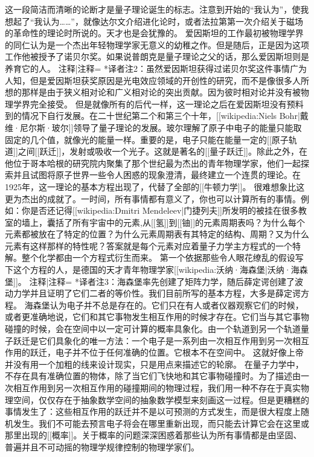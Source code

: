     这一段简洁而清晰的论断才是量子理论诞生的标志。注意到开始的“我认为”，使我想起了“我认为……”，就像达尔文介绍进化论时，或者法拉第第一次介绍关于磁场的革命性的理论时所说的。天才也是会犹豫的。
    爱因斯坦的工作最初被物理学界的同仁认为是一个杰出年轻物理学家无意义的幼稚之作。但是随后，正是因为这项工作他被授予了诺贝尔奖。如果说普朗克是量子理论之父的话，那么爱因斯坦则是养育它的人。
{{注释|注释=
*译者注2：虽然爱因斯坦获得过诺贝尔奖这件事情广为人知，但是爱因斯坦获奖原因是光电效应领域的开创性的研究，而不是像很多人所想的那样是由于狭义相对论和广义相对论的突出贡献。因为彼时相对论并没有被物理学界完全接受。
}}
    但是就像所有的后代一样，这一理论之后在爱因斯坦没有预料到的情况下自行发展。在二十世纪第二个和第三个十年，[[wikipedia:Niels Bohr|戴维·尼尔斯·玻尔]]领导了量子理论的发展。玻尔理解了原子中电子的能量只能取固定的几个值，就像光的能量一样。重要的是，电子只能在能量一定的[[原子轨道]]之间[[跃迁]]，发射或吸收一个光子。这就是著名的[[量子跃迁]]。除此之外，在他位于哥本哈根的研究院内聚集了那个世纪最为杰出的青年物理学家，他们一起探索并且试图将原子世界一些令人困惑的现象澄清，最终建立一个连贯的理论。在1925年，这一理论的基本方程出现了，代替了全部的[[牛顿力学]]。
    很难想象比这更为杰出的成就了。一时间，所有事情都有意义了，你也可以计算所有的事情。例如：你是否还记得[[wikipedia:Dmitri Mendeleev|门捷列夫]]所发明的被挂在很多教室的墙上，囊括了所有宇宙中的元素,从[[氢]]到[[铀]]的元素周期表吗？为什么每个元素都被放在了特定的位置？为什么元素周期表有其特定的结构、周期？又为什么元素有这样那样的特性呢？答案就是每个元素对应着量子力学主方程式的一个特解。整个化学都由一个方程式衍生而来。
    第一个依据那些令人眼花缭乱的假设写下这个方程的人，是德国的天才青年物理学家[[wikipedia:沃纳·海森堡|沃纳·海森堡]]。
{{注释|注释=
*译者注3：海森堡率先创建了矩阵力学，随后薛定谔创建了波动力学并且证明了它们二者的等价性。我们目前所写的基本方程，大多是薛定谔方程。
}}
    海森堡认为电子并不总是存在的。它们只在有人或者仪器观察它们的时候，或者更准确地说，它们和其它事物发生相互作用的时候才存在。它们当与其它事物碰撞的时候，会在空间中以一定可计算的概率具象化。由一个轨道到另一个轨道量子跃迁是它们具象化的唯一方法：一个电子是一系列由一次相互作用到另一次相互作用的跃迁，电子并不位于任何准确的位置。它根本不在空间中。
    这就好像上帝并没有用一个加粗的线来设计现实，只是用点来描述它的轮廓。
    在量子力学中，不存在具有准确位置的物体，除了当它们飞快地和其它事物碰撞时。为了描述由一次相互作用到另一次相互作用的碰撞期间的物理过程，我们用一种不存在于真实物理空间，仅仅存在于抽象数学空间的抽象数学模型来刻画这一过程。但是更糟糕的事情发生了：这些相互作用的跃迁并不是以可预测的方式发生，而是很大程度上随机发生。我们不可能去预言电子将会在哪里重新出现，而只能去计算它会在这里或那里出现的[[概率]]。关于概率的问题深深困惑着那些认为所有事情都是由坚固、普遍并且不可动摇的物理学规律控制的物理学家们。   
